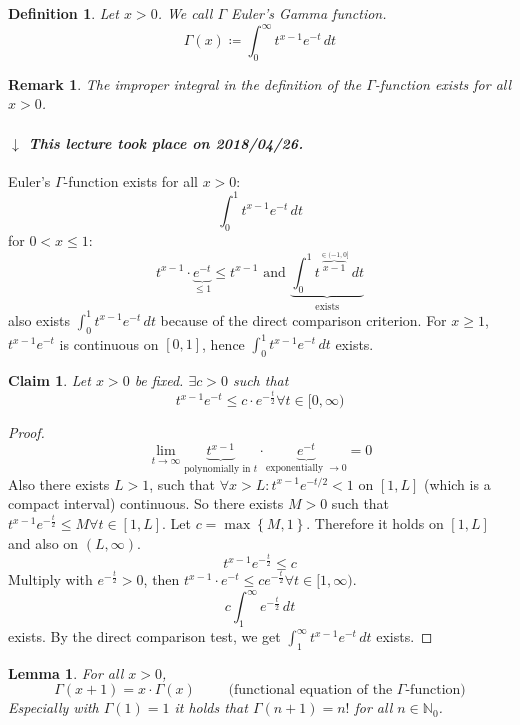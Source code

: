 \documentclass{article}
\newtheorem{definition}{Definition}  \numberwithin{definition}{section}
\newtheorem{lemma}{Lemma}  \numberwithin{lemma}{section}
\newtheorem*{claim}{Claim}%
\newtheorem{remark}{Remark}  \numberwithin{remark}{section}
\newcommand{\set}[1]{\left\{#1\right\}}
\newcommand{\dateref}[1]{%
  \begin{mdframed}[backgroundcolor=gray!10,innerbottommargin=0pt,innertopmargin=0pt]
    \paragraph{\textit{$\downarrow$ This lecture took place on #1.}}%
  \end{mdframed}%
}
\begin{document}
\begin{definition} %
  Let $x > 0$.
  We call $\Gamma$ \emph{Euler's Gamma function}.
  \[ \Gamma(x) \coloneqq \int_0^\infty t^{x - 1} e^{-t} \, dt \]
\end{definition}

\begin{remark}
  The improper integral in the definition of the $\Gamma$-function exists for all $x > 0$.
\end{remark}

\dateref{2018/04/26}

Euler's $\Gamma$-function exists for all $x > 0$:
\[ \int_0^1 t^{x-1} e^{-t} \,dt \]
for $0 < x \leq 1$:
\[ t^{x-1} \cdot \underbrace{e^{-t}}_{\leq 1} \leq t^{x-1} \text{ and } \underbrace{\int_0^1 t^{\overbrace{x-1}^{\in (-1,0]}} \, dt}_{\text{exists}} \]
also exists $\int_0^1 t^{x-1} e^{-t} \, dt$ because of the direct comparison criterion.
For $x \geq 1$, $t^{x-1} e^{-t}$ is continuous on $[0,1]$, hence $\int_0^1 t^{x-1} e^{-t} \, dt$ exists.

\begin{claim}
  Let $x > 0$ be fixed. $\exists c > 0$ such that
  \[ t^{x-1} e^{-t} \leq c \cdot e^{-\frac t2} \forall t \in [0,\infty) \]
\end{claim}

\begin{proof}
  \[ \lim_{t\to\infty} \underbrace{t^{x-1}}_{\text{polynomially in } t} \cdot \underbrace{e^{-t}}_{\text{exponentially } \to 0} = 0 \]
  Also there exists $L > 1$, such that $\forall x > L: t^{x-1} e^{-t/2} < 1$ on $[1,L]$ (which is a compact interval) continuous.
  So there exists $M > 0$ such that $t^{x-1} e^{-\frac t2} \leq M \forall t \in [1,L]$.
  Let $c = \max\set{M, 1}$. Therefore it holds on $[1,L]$ and also on $(L,\infty)$.
  \[ t^{x-1} e^{-\frac t2} \leq c \]
  Multiply with $e^{-\frac t2} > 0$, then $t^{x-1} \cdot e^{-t} \leq ce^{-\frac t2} \forall t \in [1,\infty)$.
  \[ c \int_1^\infty e^{-\frac t2} \, dt \]
  exists.
  By the direct comparison test, we get $\int_1^\infty t^{x-1} e^{-t} \, dt$ exists.
\end{proof}

\begin{lemma} %
  \label{lemma13}
  For all $x > 0$,
  \[ \Gamma(x + 1) = x \cdot \Gamma(x) \qquad \text{ (functional equation of the $\Gamma$-function)} \]
  Especially with $\Gamma(1) = 1$ it holds that $\Gamma(n+1) = n!$ for all $n \in \mathbb N_0$.
\end{lemma}
\end{document}
